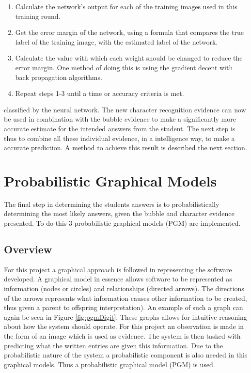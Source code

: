 \begin{enumerate}
\item Calculate the network's output for each of the training images used in this training round.
\item Get the error margin of the network, using a formula that compares the true label of the training image, with the estimated label of the network.
\item Calculate the value with which each weight should be changed to reduce the error margin. One method of doing this is using the gradient decent with back propagation algorithms.
\item Repeat steps 1-3 until a time or accuracy criteria is met.
\end{enumerate}

classified by the neural network. The new character recognition evidence can now be used in combination with the bubble evidence to make a significantly more accurate estimate for the intended answers from the student. The next step is thus to combine all these individual evidence, in a intelligence way, to make a accurate prediction. A method to achieve this result is described the next section.


\section{Probabilistic Graphical Models}
\label{sec:PGM}

The final step in determining the students answers is to probabilistically determining the most likely answers, given the bubble and character evidence presented. To do this 3 probabilistic graphical models (PGM) are implemented.

\subsection{Overview}

For this project a graphical approach is followed in representing the software developed. A graphical model in essence allows software to be represented as information (nodes or circles) and relationships (directed arrows). The directions of the arrows represents what information causes other information to be created, thus given a parent to offspring interpretation). An example of such a graph can again be seen in Figure \ref{fig:pgmDigit}. These graphs allows for intuitive reasoning about how the system should operate. For this project an observation is made in the form of an image which is used as evidence. The system is then tasked with predicting what the written entries are given this information. Due to the probabilistic nature of the system a probabilistic component is also needed in this graphical models. Thus a probabilistic graphical model (PGM) is used.

